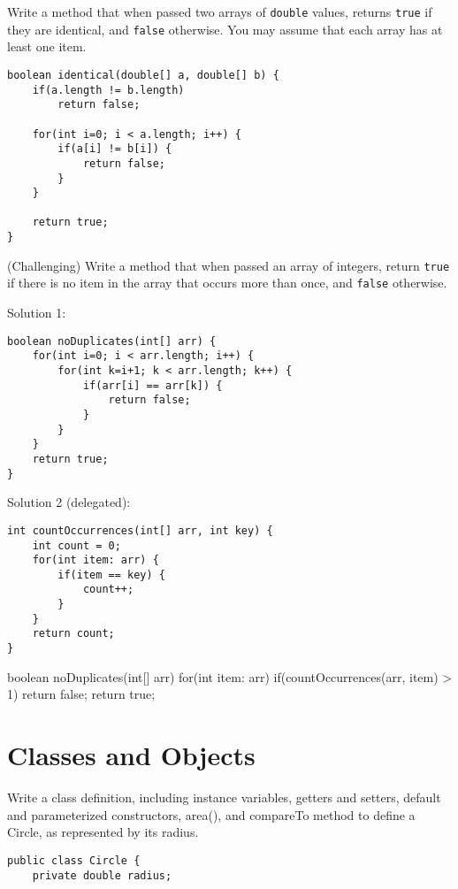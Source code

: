 \documentclass[11pt]{exam}
\begin{document}
\begin{questions}
\question Write a method that when passed two arrays of \texttt{double} values, returns \texttt{true} if they are identical, and \texttt{false} otherwise. You may assume that each array has at least one item.

\begin{solution}
\begin{lstlisting}
boolean identical(double[] a, double[] b) {
	if(a.length != b.length)
		return false;
	
	for(int i=0; i < a.length; i++) {
		if(a[i] != b[i]) {
			return false;	
		}
	}
	
	return true;
}
\end{lstlisting}	
\end{solution}

\question (Challenging) Write a method that when passed an array of integers, return \texttt{true} if there is no item in the array that occurs more than once, and \texttt{false} otherwise.

\begin{solution}
Solution 1:
\begin{lstlisting}
boolean noDuplicates(int[] arr) {
	for(int i=0; i < arr.length; i++) {
		for(int k=i+1; k < arr.length; k++) {
			if(arr[i] == arr[k]) {
				return false;
			}
		}
	}
	return true;	
}
\end{lstlisting}	

Solution 2 (delegated):

\begin{lstlisting}
int countOccurrences(int[] arr, int key) {
	int count = 0;
	for(int item: arr) {
		if(item == key) {
			count++;
		}
	}
	return count;
}
\end{lstlisting}	

boolean noDuplicates(int[] arr) {
	for(int item: arr) {
		if(countOccurrences(arr, item) > 1) {
			return false;
		}
	}
	return true;
}
\end{solution}

\newpage \section{Classes and Objects}

\question Write a class definition, including instance variables, getters and setters, default and parameterized constructors, area(), and compareTo method to define a Circle, as represented by its radius.

\begin{solution}
\begin{lstlisting}
public class Circle {
	private double radius;
	

\end{lstlisting}
\end{solution}
\end{questions}
\end{document}
